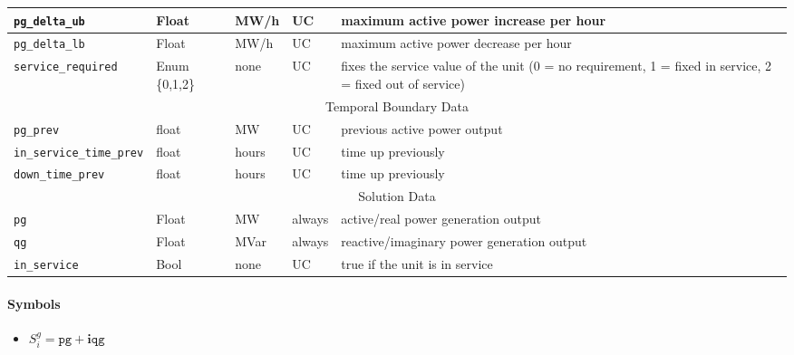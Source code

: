 \documentclass{article}
\begin{document}
\begin{table}[h!]
\begin{tabular}{|l|l|l|l|p{6cm}|}
\hline
%
\texttt{pg\_delta\_ub} & Float & MW/h & UC & maximum active power increase per hour \\ 
\hline
\texttt{pg\_delta\_lb} & Float & MW/h & UC & maximum active power decrease per hour \\ 
\hline
%
\texttt{service\_required} & Enum \{0,1,2\} & none & UC & fixes the service value of the unit (0 = no requirement, 1 = fixed in service, 2 = fixed out of service)  \\ 
\hline
%
\hline
\multicolumn{5}{|c|}{Temporal Boundary Data} \\
\hline
\texttt{pg\_prev} & float & MW & UC & previous active power output \\
\hline
\texttt{in\_service\_time\_prev} & float & hours & UC & time up previously \\
\hline
\texttt{down\_time\_prev} & float & hours & UC & time up previously \\
\hline
%
\hline
\multicolumn{5}{|c|}{Solution Data} \\
\hline
\texttt{pg} & Float & MW & always & active/real power generation output \\ 
\hline
\texttt{qg} & Float & MVar & always & reactive/imaginary power generation output
\\
\hline
\texttt{in\_service} & Bool & none & UC & true if the unit is in service \\
\hline
\end{tabular}
\label{tbl:gen}
\end{table}


\paragraph{Symbols}
\begin{itemize}
    \item $S^g_i = \texttt{pg} + \bm i \texttt{qg}$
\end{itemize}
\end{document}
